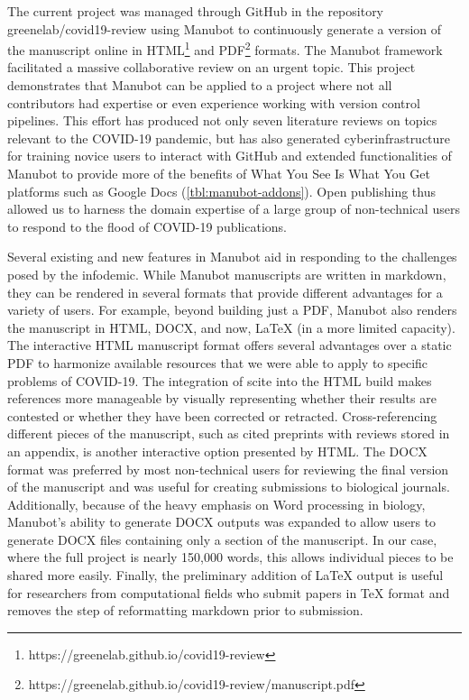 \documentclass[twocolumn]{ceurart}
\begin{document}
The current project was managed through GitHub in the repository greenelab/covid19-review using Manubot \citep{YuJbg3zO} to continuously generate a version of the manuscript online in HTML\footnote{https://greenelab.github.io/covid19-review} and PDF\footnote{https://greenelab.github.io/covid19-review/manuscript.pdf} formats.
The Manubot framework facilitated a massive collaborative review on an urgent topic.
This project demonstrates that Manubot can be applied to a project where not all contributors had expertise or even experience working with version control pipelines.
This effort has produced not only seven literature reviews on topics relevant to the COVID-19 pandemic, but has also generated cyberinfrastructure for training novice users to interact with GitHub and extended functionalities of Manubot to provide more of the benefits of What You See Is What You Get platforms such as Google Docs (\ref{tbl:manubot-addons}).
Open publishing thus allowed us to harness the domain expertise of a large group of non-technical users to respond to the flood of COVID-19 publications.

Several existing and new features in Manubot aid in responding to the challenges posed by the infodemic.
While Manubot manuscripts are written in markdown, they can be rendered in several formats that provide different advantages for a variety of users.
For example, beyond building just a PDF, Manubot also renders the manuscript in HTML, DOCX, and now, LaTeX (in a more limited capacity).
The interactive HTML manuscript format offers several advantages over a static PDF to harmonize available resources that we were able to apply to specific problems of COVID-19.
The integration of scite into the HTML build makes references more manageable by visually representing whether their results are contested or whether they have been corrected or retracted.
Cross-referencing different pieces of the manuscript, such as cited preprints with reviews stored in an appendix, is another interactive option presented by HTML.
The DOCX format was preferred by most non-technical users for reviewing the final version of the manuscript and was useful for creating submissions to biological journals.
Additionally, because of the heavy emphasis on Word processing in biology, Manubot's ability to generate DOCX outputs was expanded to allow users to generate DOCX files containing only a section of the manuscript.
In our case, where the full project is nearly 150,000 words, this allows individual pieces to be shared more easily.
Finally, the preliminary addition of LaTeX output is useful for researchers from computational fields who submit papers in TeX format and removes the step of reformatting markdown prior to submission.
\end{document}
